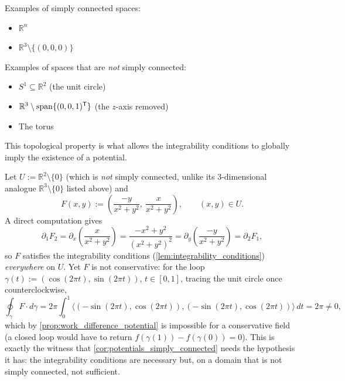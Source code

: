 \begin{ainote}
\begin{center}
\end{center}

Examples of simply connected spaces:
\begin{itemize}
    \item $\mathbb{R}^n$
    \item $\mathbb{R}^3 \setminus \{(0,0,0)\}$
\end{itemize}
Examples of spaces that are \emph{not} simply connected:
\begin{itemize}
    \item $S^1 \subseteq \mathbb{R}^2$ (the unit circle)
    \item $\mathbb{R}^3 \setminus \operatorname{span}\{(0,0,1)^{\mathsf{T}}\}$ (the $z$-axis removed)
    \item The torus
\end{itemize}
This topological property is what allows the integrability conditions to globally imply the existence of a potential.
\end{ainote}

\begin{example}
\label{ex:vortex_field_not_conservative}
Let $U := \mathbb{R}^2\setminus\{0\}$ (which is \emph{not} simply connected, unlike its
$3$-dimensional analogue $\mathbb{R}^3\setminus\{0\}$ listed above) and
\[F(x,y) := \left(\frac{-y}{x^2+y^2},\ \frac{x}{x^2+y^2}\right), \qquad (x,y) \in U.\]
A direct computation gives
\[\partial_1F_2 = \partial_x\!\left(\frac{x}{x^2+y^2}\right) = \frac{-x^2+y^2}{(x^2+y^2)^2}
  = \partial_y\!\left(\frac{-y}{x^2+y^2}\right) = \partial_2F_1,\]
so $F$ satisfies the integrability conditions (\cref{lem:integrability_conditions})
\emph{everywhere} on $U$. Yet $F$ is not conservative: for the loop
$\gamma(t) := (\cos(2\pi t),\sin(2\pi t))$, $t\in[0,1]$, tracing the unit circle once
counterclockwise,
\[\oint_\gamma F\cdot d\gamma
  = 2\pi\int_0^1\langle(-\sin(2\pi t),\cos(2\pi t)),(-\sin(2\pi t),\cos(2\pi t))\rangle\,dt
  = 2\pi \neq 0,\]
which by \cref{prop:work_difference_potential} is impossible for a conservative field (a closed
loop would have to return $f(\gamma(1))-f(\gamma(0))=0$). This is exactly the witness that
\cref{cor:potentials_simply_connected} needs the hypothesis it has: the integrability
conditions are necessary but, on a domain that is not simply connected, not sufficient.
\end{example}

